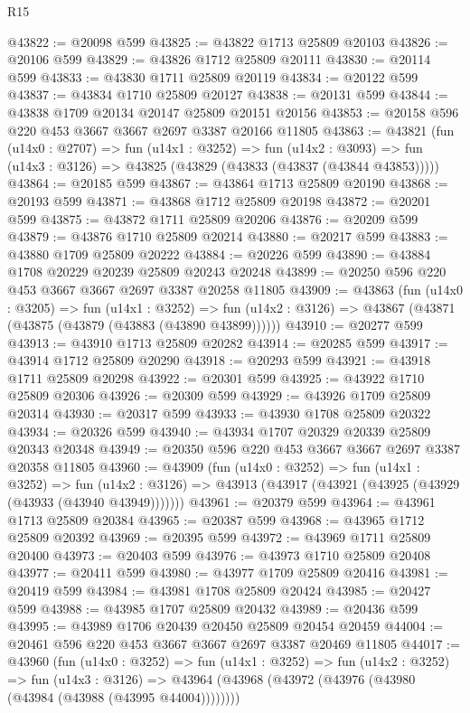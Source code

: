 \begin{lexlean}{R15}
\begin{coremodule}
@43822 := @20098 @599
@43825 := @43822 @1713 @25809 @20103
@43826 := @20106 @599
@43829 := @43826 @1712 @25809 @20111
@43830 := @20114 @599
@43833 := @43830 @1711 @25809 @20119
@43834 := @20122 @599
@43837 := @43834 @1710 @25809 @20127
@43838 := @20131 @599
@43844 := @43838 @1709 @20134 @20147 @25809 @20151 @20156
@43853 := @20158 @596 @220 @453 @3667 @3667 @2697 @3387 @20166 @11805
@43863 := @43821
    (fun (u14x0 : @2707) =>
    fun (u14x1 : @3252) =>
    fun (u14x2 : @3093) => fun (u14x3 : @3126) => @43825 (@43829 (@43833 (@43837 (@43844 @43853)))))
@43864 := @20185 @599
@43867 := @43864 @1713 @25809 @20190
@43868 := @20193 @599
@43871 := @43868 @1712 @25809 @20198
@43872 := @20201 @599
@43875 := @43872 @1711 @25809 @20206
@43876 := @20209 @599
@43879 := @43876 @1710 @25809 @20214
@43880 := @20217 @599
@43883 := @43880 @1709 @25809 @20222
@43884 := @20226 @599
@43890 := @43884 @1708 @20229 @20239 @25809 @20243 @20248
@43899 := @20250 @596 @220 @453 @3667 @3667 @2697 @3387 @20258 @11805
@43909 := @43863
    (fun (u14x0 : @3205) =>
    fun (u14x1 : @3252) =>
    fun (u14x2 : @3126) => @43867 (@43871 (@43875 (@43879 (@43883 (@43890 @43899))))))
@43910 := @20277 @599
@43913 := @43910 @1713 @25809 @20282
@43914 := @20285 @599
@43917 := @43914 @1712 @25809 @20290
@43918 := @20293 @599
@43921 := @43918 @1711 @25809 @20298
@43922 := @20301 @599
@43925 := @43922 @1710 @25809 @20306
@43926 := @20309 @599
@43929 := @43926 @1709 @25809 @20314
@43930 := @20317 @599
@43933 := @43930 @1708 @25809 @20322
@43934 := @20326 @599
@43940 := @43934 @1707 @20329 @20339 @25809 @20343 @20348
@43949 := @20350 @596 @220 @453 @3667 @3667 @2697 @3387 @20358 @11805
@43960 := @43909
    (fun (u14x0 : @3252) =>
    fun (u14x1 : @3252) =>
    fun (u14x2 : @3126) => @43913 (@43917 (@43921 (@43925 (@43929 (@43933 (@43940 @43949)))))))
@43961 := @20379 @599
@43964 := @43961 @1713 @25809 @20384
@43965 := @20387 @599
@43968 := @43965 @1712 @25809 @20392
@43969 := @20395 @599
@43972 := @43969 @1711 @25809 @20400
@43973 := @20403 @599
@43976 := @43973 @1710 @25809 @20408
@43977 := @20411 @599
@43980 := @43977 @1709 @25809 @20416
@43981 := @20419 @599
@43984 := @43981 @1708 @25809 @20424
@43985 := @20427 @599
@43988 := @43985 @1707 @25809 @20432
@43989 := @20436 @599
@43995 := @43989 @1706 @20439 @20450 @25809 @20454 @20459
@44004 := @20461 @596 @220 @453 @3667 @3667 @2697 @3387 @20469 @11805
@44017 := @43960
    (fun (u14x0 : @3252) =>
    fun (u14x1 : @3252) =>
    fun (u14x2 : @3252) =>
    fun (u14x3 : @3126) =>
    @43964 (@43968 (@43972 (@43976 (@43980 (@43984 (@43988 (@43995 @44004))))))))

\end{coremodule}
\end{lexlean}
